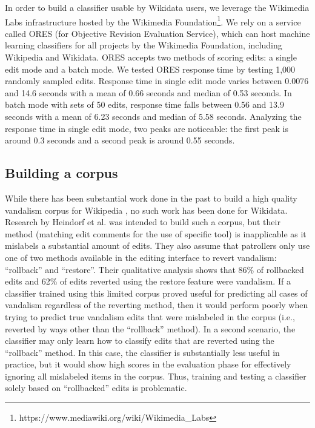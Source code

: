 \documentclass{sig-alternate-2013}
\begin{document}
In order to build a classifier usable by Wikidata users, we leverage the Wikimedia Labs infrastructure hosted by the Wikimedia Foundation\footnote{https://www.mediawiki.org/wiki/Wikimedia\_Labs}. We rely on a service called ORES (for Objective Revision Evaluation Service), which can host machine learning classifiers for all projects by the Wikimedia Foundation, including Wikipedia and Wikidata. ORES accepts two methods of scoring edits: a single edit mode and a batch mode. We tested ORES response time by testing 1,000 randomly sampled edits. Response time in single edit mode varies between 0.0076 and 14.6 seconds with a mean of 0.66 seconds and median of 0.53 seconds. In batch mode with sets of 50 edits, response time falls between 0.56 and 13.9 seconds with a mean of 6.23 seconds and median of 5.58 seconds. Analyzing the response time in single edit mode, two peaks are noticeable: the first peak is around 0.3 seconds and a second peak is around 0.55 seconds.

\subsection{Building a corpus}
While there has been substantial work done in the past to build a high quality vandalism corpus for Wikipedia \cite{potthast:crowdsourcing}, no such work has been done for Wikidata.  Research by Heindorf et al. \cite{heindorf:towards} was intended to build such a corpus, but their method (matching edit comments for the use of specific tool) is inapplicable as it mislabels a substantial amount of edits.  They also assume that patrollers only use one of two methods available in the editing interface to revert vandalism: ``rollback'' and ``restore''.  Their qualitative analysis shows that 86\% of rollbacked edits and 62\% of edits reverted using the restore feature were vandalism.  If a classifier trained using this limited corpus proved useful for predicting all cases of vandalism regardless of the reverting method, then it would perform poorly when trying to predict true vandalism edits that were mislabeled in the corpus (i.e., reverted by ways other than the ``rollback'' method).  In a second scenario, the classifier may only learn how to classify edits that are reverted using the ``rollback'' method. In this case, the classifier is substantially less useful in practice, but it would show high scores in the evaluation phase for effectively ignoring all mislabeled items in the corpus.  Thus, training and testing a classifier solely based on ``rollbacked'' edits is problematic.
\end{document}
